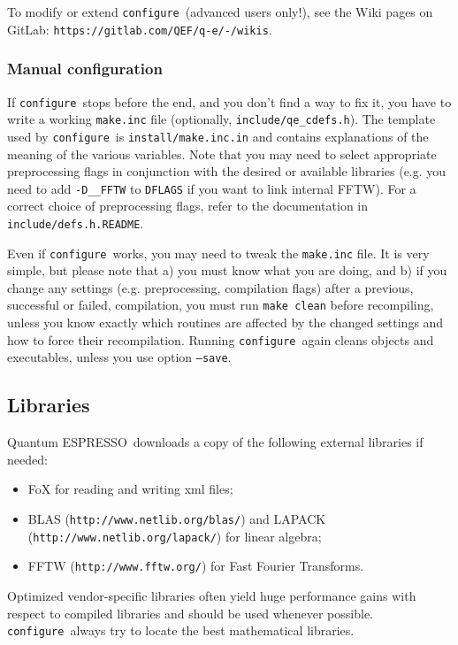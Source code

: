 \documentclass[12pt,a4paper]{article}
\def\qe{{\sc Quantum ESPRESSO}}
\def\configure{\texttt{configure}}
\begin{document}
To modify or extend \configure\ (advanced users only!), see the Wiki pages
on GitLab: \texttt{https://gitlab.com/QEF/q-e/-/wikis}.

\subsubsection{Manual configuration}
\label{SubSec:manconf}
If \configure\ stops before the end, and you don't find a way to fix
it, you have to write a working \texttt{make.inc} file (optionally,
\texttt{include/qe\_cdefs.h}). The template used by \configure\ is
\texttt{install/make.inc.in} and contains explanations of the meaning
of the various variables. Note that you may need
to select appropriate preprocessing flags
in conjunction with the desired or available
libraries (e.g. you need to add \texttt{-D\_\_FFTW} to \texttt{DFLAGS}
if you want to link internal FFTW). For a correct choice of preprocessing
flags, refer to the documentation in \texttt{include/defs.h.README}.

Even if \configure\ works, you may need to tweak the \texttt{make.inc}
file. It is very simple, but please note that a) you must know what you are
doing, and b) if you change any settings
(e.g. preprocessing, compilation flags)
after a previous, successful or failed, compilation, you must run
\texttt{make clean} before recompiling, unless you know exactly which
routines are affected by the changed settings and how to force their
recompilation. Running \configure\ again cleans objects and executables,
unless you use option \texttt{--save}.

\subsection{Libraries}
\label{Sec:Libraries}

\qe\ downloads a copy of the following external libraries if needed:
\begin{itemize}
 \item FoX for reading and writing xml files;
 \item BLAS (\texttt{http://www.netlib.org/blas/}) and LAPACK
  (\texttt{http://www.netlib.org/lapack/}) for linear algebra;
\item FFTW (\texttt{http://www.fftw.org/}) for Fast Fourier Transforms.
\end{itemize}
Optimized vendor-specific libraries often yield huge performance gains
with respect to compiled libraries and should be used whenever
possible. \configure\ always try to locate the best mathematical
libraries.
\\
\end{document}

